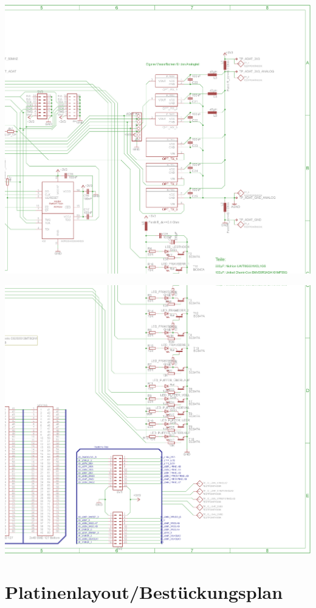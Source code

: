 		\noindent
		\includegraphics[width=\linewidth]{Medien/schaltplan3.png}
		\clearpage
		
		\noindent
		\includegraphics[width=\linewidth]{Medien/schaltplan4.png}
		\clearpage
		
		
	\section{Platinenlayout/Bestückungsplan}
